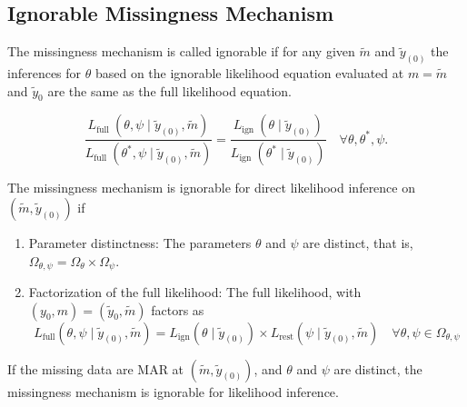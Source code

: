 \subsection{Ignorable Missingness Mechanism}

\begin{definition}
	The missingness mechanism is called ignorable if for any given \(\tilde{m}\) and  \(\tilde{y}_{(0)}\) the inferences for \(\theta\) based on the ignorable likelihood equation evaluated at \(m=\tilde{m}\) and \(\tilde{y}_{0}\) are the same as the full likelihood equation.
\end{definition}

\begin{remark}
	\begin{equation}
		\frac{L_{\text {full }}\left(\theta, \psi \mid \tilde{y}_{(0)}, \tilde{m}\right)}{L_{\text {full }}\left(\theta^{*}, \psi \mid \tilde{y}_{(0)}, \tilde{m}\right)}=\frac{L_{\text {ign }}\left(\theta \mid \tilde{y}_{(0)}\right)}{L_{\text {ign }}\left(\theta^{*} \mid \tilde{y}_{(0)}\right)} \quad \forall \theta, \theta^{*}, \psi.
	\end{equation}
\end{remark}

\begin{theorem}
	The missingness mechanism is ignorable for direct likelihood inference on \(\left(\tilde{m},\tilde{y}_{(0)}\right)\) if
	\begin{enumerate}
		\item Parameter distinctness: The parameters \(\theta\) and \(\psi\) are distinct, that is, \(\Omega_{\theta, \psi}=\Omega_{\theta} \times \Omega_{\psi}\).
		\item Factorization of the full likelihood: The full likelihood, with \(\left(y_{0}, m\right)=\left(\tilde{y}_{0}, \tilde{m}\right)\) factors as
		      \begin{equation}
			      L_{\text{full}}\left(\theta,\psi\mid\tilde{y}_{(0)},\tilde{m}\right)=L_{\text{ign}}\left(\theta\mid\tilde{y}_{(0)}\right)\times L_{\text{rest}}\left(\psi\mid\tilde{y}_{(0)},\tilde{m}\right)\quad\forall\theta,\psi\in\Omega_{\theta,\psi}
			      \label{equation:factorization-of-the-full-likelihood}
		      \end{equation}
	\end{enumerate}
\end{theorem}

\begin{corollary}
	If the missing data are MAR at \(\left(\tilde{m}, \tilde{y}_{(0)}\right)\), and \(\theta\) and \(\psi\) are distinct, the missingness mechanism is ignorable for likelihood inference.
\end{corollary}

